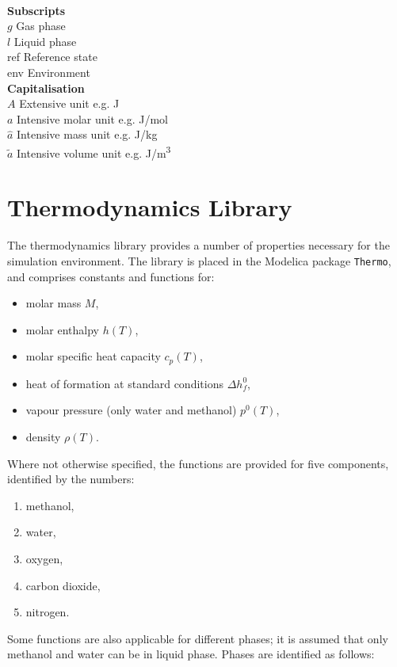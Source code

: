 \documentclass[a4paper]{article}
\begin{document}
\begin{multicols}{2}
\begin{tabbing}
\\\textbf{Subscripts}\\
$g$ \> Gas phase\\
$l$ \> Liquid phase\\
ref \> Reference state\\
env \> Environment\\
\textbf{Capitalisation}\\
$A$ \> Extensive unit \> e.g. J\\
$a$ \> Intensive molar unit \> e.g. J/mol\\
$\hat a$ \> Intensive mass unit \> e.g. J/kg\\
$\tilde a$ \> Intensive volume unit \> e.g. J/m\textsuperscript{3}
\end{tabbing}
\end{multicols}


\section{Thermodynamics Library}
The thermodynamics library provides a number of properties necessary for the
simulation environment. The library is placed in the Modelica package
\texttt{Thermo}, and comprises constants and functions for:

\begin{itemize}
\item molar mass $M$,
\item molar enthalpy $h(T)$,
\item molar specific heat capacity $c_p(T)$,
\item heat of formation at standard conditions $\Delta h_f^0$,
\item vapour pressure (only water and methanol) $p^0(T)$,
\item density $\rho(T)$.
\end{itemize}

Where not otherwise specified, the functions are provided for five components,
identified by the numbers:

\begin{enumerate}
\item methanol,
\item water,
\item oxygen,
\item carbon dioxide,
\item nitrogen.
\end{enumerate}

Some functions are also applicable for different phases; it is assumed that only
methanol and water can be in liquid phase. Phases are identified as follows:
\end{document}
